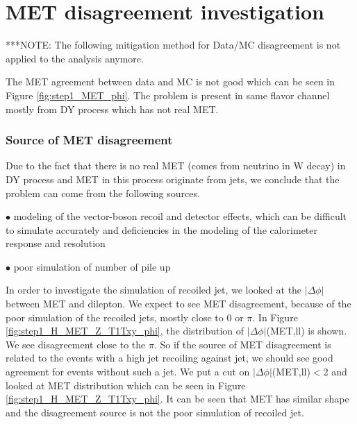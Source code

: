 \clearpage
\section{MET disagreement investigation}
\label{MET_disagreement_investigation}

***NOTE: The following mitigation method for Data/MC disagreement is not applied to the analysis anymore.

The MET agreement between data and MC is not good which can be seen in
Figure \ref{fig:step1_MET_phi}.
The problem is present in same flavor channel mostly from DY process which has not real MET.

\subsubsection {Source of MET disagreement}
Due to the fact that there is no real MET (comes from neutrino in W decay) in DY process and MET in this process originate from jets, we conclude that the problem can come from the following sources.

$\bullet$ modeling of the vector-boson recoil and detector effects, which can be difficult to simulate accurately and deficiencies in the modeling of the calorimeter response and resolution \cite{recoil}

$\bullet$ poor simulation of number of pile up

In order to investigate the simulation of recoiled jet, we looked at the  $|\Delta \phi|$ between MET and dilepton.
We expect to see MET disagreement, because of the poor simulation of the recoiled jets, mostly  close to 0 or $\pi$.
In Figure \ref{fig:step1_H_MET_Z_T1Txy_phi}, the distribution of $|\Delta \phi|$(MET,ll) is shown. We see disagreement close to the $\pi$.
So if the source of MET disagreement is related to the events with a high \pt jet recoiling against jet, we should see good agreement for events without such a jet.
We put a cut on $|\Delta \phi|$(MET,ll)$<$2 and looked at MET distribution which can be seen in Figure \ref{fig:step1_H_MET_Z_T1Txy_phi}.
It can be seen that MET has similar shape and the disagreement source is not the poor simulation of recoiled jet.


